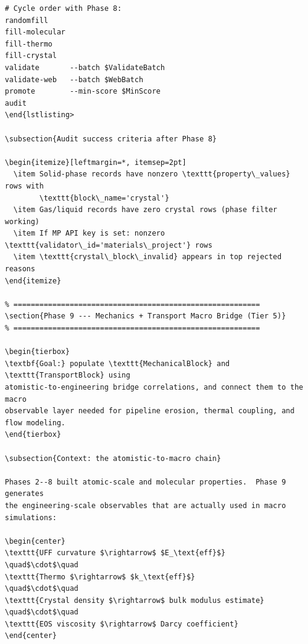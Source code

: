 \documentclass[11pt, a4paper]{article}
\begin{document}
\begin{lstlisting}[language={}]
# Cycle order with Phase 8:
randomfill
fill-molecular
fill-thermo
fill-crystal
validate       --batch $ValidateBatch
validate-web   --batch $WebBatch
promote        --min-score $MinScore
audit
\end{lstlisting>

\subsection{Audit success criteria after Phase 8}

\begin{itemize}[leftmargin=*, itemsep=2pt]
  \item Solid-phase records have nonzero \texttt{property\_values} rows with
		\texttt{block\_name='crystal'}
  \item Gas/liquid records have zero crystal rows (phase filter working)
  \item If MP API key is set: nonzero \texttt{validator\_id='materials\_project'} rows
  \item \texttt{crystal\_block\_invalid} appears in top rejected reasons
\end{itemize}

% =========================================================
\section{Phase 9 --- Mechanics + Transport Macro Bridge (Tier 5)}
% =========================================================

\begin{tierbox}
\textbf{Goal:} populate \texttt{MechanicalBlock} and \texttt{TransportBlock} using
atomistic-to-engineering bridge correlations, and connect them to the macro
observable layer needed for pipeline erosion, thermal coupling, and flow modeling.
\end{tierbox}

\subsection{Context: the atomistic-to-macro chain}

Phases 2--8 built atomic-scale and molecular properties.  Phase 9 generates
the engineering-scale observables that are actually used in macro simulations:

\begin{center}
\texttt{UFF curvature $\rightarrow$ $E_\text{eff}$}
\quad$\cdot$\quad
\texttt{Thermo $\rightarrow$ $k_\text{eff}$}
\quad$\cdot$\quad
\texttt{Crystal density $\rightarrow$ bulk modulus estimate}
\quad$\cdot$\quad
\texttt{EOS viscosity $\rightarrow$ Darcy coefficient}
\end{center}


\end{lstlisting}
\end{document}
